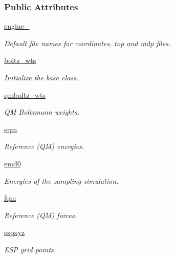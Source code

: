 \subsubsection*{Public Attributes}
\begin{DoxyCompactItemize}
\item 
\hyperlink{classforcebalance_1_1gmxio_1_1AbInitio__GMX_a5c8930da5aa8b01df62d7433da588f82}{engine\-\_\-}
\begin{DoxyCompactList}\small\item\em Default file names for coordinates, top and mdp files. \end{DoxyCompactList}\item 
\hyperlink{classforcebalance_1_1abinitio_1_1AbInitio_ac442f096d11d0294235f2c8cbe1dcbb4}{boltz\-\_\-wts}
\begin{DoxyCompactList}\small\item\em Initialize the base class. \end{DoxyCompactList}\item 
\hyperlink{classforcebalance_1_1abinitio_1_1AbInitio_a06ec6b12d81791ca94f599f41e56335a}{qmboltz\-\_\-wts}
\begin{DoxyCompactList}\small\item\em Q\-M Boltzmann weights. \end{DoxyCompactList}\item 
\hyperlink{classforcebalance_1_1abinitio_1_1AbInitio_a64387fae9bdfb0d03ca6961e67c779be}{eqm}
\begin{DoxyCompactList}\small\item\em Reference (Q\-M) energies. \end{DoxyCompactList}\item 
\hyperlink{classforcebalance_1_1abinitio_1_1AbInitio_af928d333d14cb3b93f7db78530455873}{emd0}
\begin{DoxyCompactList}\small\item\em Energies of the sampling simulation. \end{DoxyCompactList}\item 
\hyperlink{classforcebalance_1_1abinitio_1_1AbInitio_af025be2ce97da3e8dc876d70e403f4ef}{fqm}
\begin{DoxyCompactList}\small\item\em Reference (Q\-M) forces. \end{DoxyCompactList}\item 
\hyperlink{classforcebalance_1_1abinitio_1_1AbInitio_a8be2d088afb344036aae989ca3cbcc41}{espxyz}
\begin{DoxyCompactList}\small\item\em E\-S\-P grid points. \end{DoxyCompactList}\item 

\end{DoxyCompactItemize}
